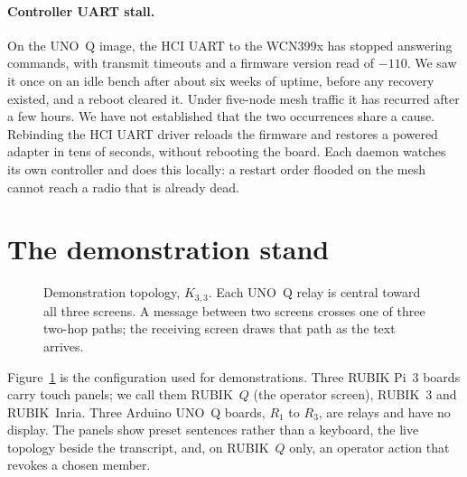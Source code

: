 \documentclass[conference,10pt]{IEEEtran}
\begin{document}
\paragraph{Controller UART stall.}
On the UNO~Q image, the HCI UART to the WCN399x has stopped answering
commands, with transmit timeouts and a firmware version read of $-110$.
We saw it once on an idle bench after about six weeks of uptime, before
any recovery existed, and a reboot cleared it. Under five-node mesh
traffic it has recurred after a few hours. We have not established that
the two occurrences share a cause. Rebinding the HCI UART driver reloads
the firmware and restores a powered adapter in tens of seconds, without
rebooting the board. Each daemon watches its own controller and does
this locally: a restart order flooded on the mesh cannot reach a radio
that is already dead.

\section{The demonstration stand}
\label{sec:stand}

\begin{figure}[t]
\centering
{}
\caption{Demonstration topology, $K_{3,3}$. Each UNO~Q relay is central
toward all three screens. A message between two screens crosses one of
three two-hop paths; the receiving screen draws that path as the text
arrives.}
\label{fig:stand}
\end{figure}

Figure~\ref{fig:stand} is the configuration used for demonstrations.
Three RUBIK Pi~3 boards carry touch panels; we call them RUBIK~$Q$ (the
operator screen), RUBIK~3 and RUBIK~Inria. Three Arduino UNO~Q boards,
$R_1$ to $R_3$, are relays and have no display. The panels show preset
sentences rather than a keyboard, the live topology beside the
transcript, and, on RUBIK~$Q$ only, an operator action that revokes a
chosen member.
\end{document}
